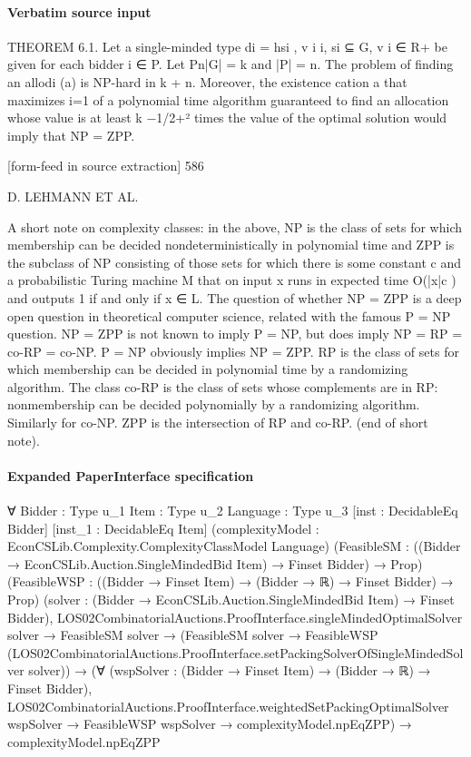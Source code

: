 \documentclass[10pt]{article}
\begin{document}
\paragraph{Verbatim source input}
\begin{ReviewVerbatim}
THEOREM 6.1. Let a single-minded type di = hsi , v i i, si ⊆ G, v i ∈ R+ be given
for each bidder i ∈ P. Let
Pn|G| = k and |P| = n. The problem of finding an allodi (a) is NP-hard in k + n. Moreover, the existence
cation a that maximizes i=1
of a polynomial time algorithm guaranteed to find an allocation whose value is at
least k −1/2+² times the value of the optimal solution would imply that NP = ZPP.


[form-feed in source extraction]
586

D. LEHMANN ET AL.

A short note on complexity classes: in the above, NP is the class of sets for which
membership can be decided nondeterministically in polynomial time and ZPP is
the subclass of NP consisting of those sets for which there is some constant c and a
probabilistic Turing machine M that on input x runs in expected time O(|x|c ) and
outputs 1 if and only if x ∈ L. The question of whether NP = ZPP is a deep open
question in theoretical computer science, related with the famous P = NP question.
NP = ZPP is not known to imply P = NP, but does imply NP = RP = co-RP =
co-NP. P = NP obviously implies NP = ZPP. RP is the class of sets for which
membership can be decided in polynomial time by a randomizing algorithm. The
class co-RP is the class of sets whose complements are in RP: nonmembership can
be decided polynomially by a randomizing algorithm. Similarly for co-NP. ZPP is
the intersection of RP and co-RP. (end of short note).
\end{ReviewVerbatim}


\paragraph{Expanded PaperInterface specification}
\begin{ReviewVerbatim}
∀ {Bidder : Type u_1} {Item : Type u_2} {Language : Type u_3} [inst : DecidableEq Bidder] [inst_1 : DecidableEq Item]
  (complexityModel : EconCSLib.Complexity.ComplexityClassModel Language)
  (FeasibleSM : ((Bidder → EconCSLib.Auction.SingleMindedBid Item) → Finset Bidder) → Prop)
  (FeasibleWSP : ((Bidder → Finset Item) → (Bidder → ℝ) → Finset Bidder) → Prop)
  (solver : (Bidder → EconCSLib.Auction.SingleMindedBid Item) → Finset Bidder),
  LOS02CombinatorialAuctions.ProofInterface.singleMindedOptimalSolver solver →
    FeasibleSM solver →
      (FeasibleSM solver →
          FeasibleWSP (LOS02CombinatorialAuctions.ProofInterface.setPackingSolverOfSingleMindedSolver solver)) →
        (∀ (wspSolver : (Bidder → Finset Item) → (Bidder → ℝ) → Finset Bidder),
            LOS02CombinatorialAuctions.ProofInterface.weightedSetPackingOptimalSolver wspSolver →
              FeasibleWSP wspSolver → complexityModel.npEqZPP) →
          complexityModel.npEqZPP
\end{ReviewVerbatim}
\end{document}

